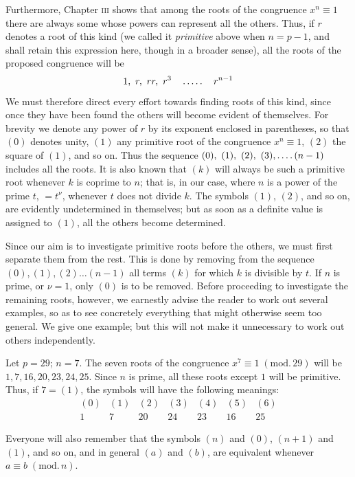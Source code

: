 Furthermore, Chapter \textsc{iii} shows that among the roots of the congruence $x^n\equiv1$ there are always some whose powers can represent all the others. Thus, if $r$ denotes a root of this kind (we called it \emph{primitive} above when $n=p-1$, and shall retain this expression here, though in a broader sense), all the roots of the proposed congruence will be
\[
1,\ r,\ rr,\ r^3\quad\mathinner{.\,.\,.\,.\,.}\quad r^{n-1}
\]
We must therefore direct every effort towards finding roots of this kind, since once they have been found the others will become evident of themselves. For brevity we denote any power of $r$ by its exponent enclosed in parentheses, so that $(0)$ denotes unity, $(1)$ any primitive root of the congruence $x^n\equiv1$, $(2)$ the square of $(1)$, and so on. Thus the sequence $(0),\ (1),\ (2),\ (3),\dotsfour(n-1)$ includes all the roots. It is also known that $(k)$ will always be such a primitive root whenever $k$ is coprime to $n$; that is, in our case, where $n$ is a power of the prime $t$, $=t^\nu$, whenever $t$ does not divide $k$. The symbols $(1)$, $(2)$, and so on, are evidently undetermined in themselves; but as soon as a definite value is assigned to $(1)$, all the others become determined.

Since our aim is to investigate primitive roots before the others, we must first separate them from the rest. This is done by removing from the sequence $(0),(1),(2)\ldots(n-1)$ all terms $(k)$ for which $k$ is divisible by $t$. If $n$ is prime, or $\nu=1$, only $(0)$ is to be removed. Before proceeding to investigate the remaining roots, however, we earnestly advise the reader to work out several examples, so as to see concretely everything that might otherwise seem too general. We give one example; but this will not make it unnecessary to work out others independently.

Let $p=29$; $n=7$. The seven roots of the congruence $x^7\equiv1\;(\mathrm{mod.}\,29)$ will be $1,7,16,20,23,24,25$. Since $n$ is prime, all these roots except $1$ will be primitive. Thus, if $7=(1)$, the symbols will have the following meanings:
\[
\begin{array}{ccccccc}
(0)&(1)&(2)&(3)&(4)&(5)&(6)\\
1&7&20&24&23&16&25
\end{array}
\]

Everyone will also remember that the symbols $(n)$ and $(0)$, $(n+1)$ and $(1)$, and so on, and in general $(a)$ and $(b)$, are equivalent whenever $a\equiv b\;(\mathrm{mod.}\,n)$.

